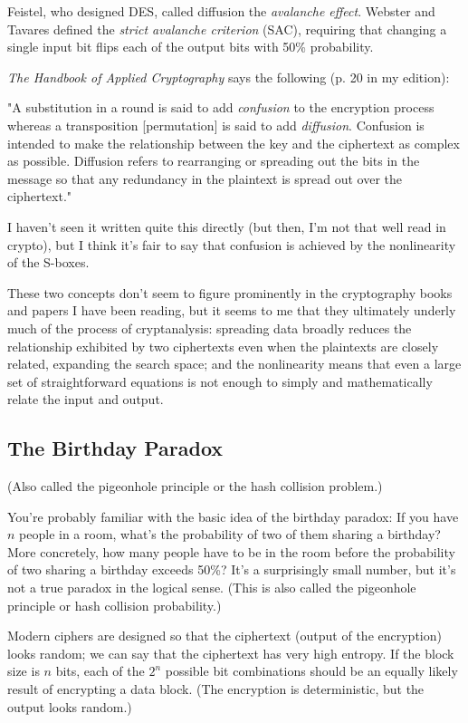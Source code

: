 \documentclass[%
 aip,
 jmp,%
 amsmath,amssymb,
 reprint,%
]{revtex4-1}
\begin{document}
Feistel, who designed DES, called diffusion the \emph{avalanche effect}.
Webster and Tavares defined the \emph{strict avalanche criterion} (SAC),
requiring that changing a single input bit flips each of the output
bits with 50\% probability.

\emph{The Handbook of Applied Cryptography} says the following (p. 20 in my
edition):

"A substitution in a round is said to add \emph{confusion} to the
encryption process whereas a transposition [permutation] is said to
add \emph{diffusion}. Confusion is intended to make the relationship
between the key and the ciphertext as complex as possible.  Diffusion
refers to rearranging or spreading out the bits in the message so that
any redundancy in the plaintext is spread out over the ciphertext."

I haven't seen it written quite this directly (but then, I'm not that
well read in crypto), but I think it's fair to say that confusion is
achieved by the nonlinearity of the S-boxes.

These two concepts don't seem to figure prominently in the
cryptography books and papers I have been reading, but it seems to me
that they ultimately underly much of the process of cryptanalysis:
spreading data broadly reduces the relationship exhibited by two
ciphertexts even when the plaintexts are closely related, expanding
the search space; and the nonlinearity means that even a large set of
straightforward equations is not enough to simply and mathematically
relate the input and output.

\subsection{The Birthday Paradox}

(Also called the pigeonhole principle or the hash collision problem.)

You're probably familiar with the basic idea of the birthday paradox:
If you have $n$ people in a room, what's the probability of two of
them sharing a birthday?  More concretely, how many people have to be
in the room before the probability of two sharing a birthday exceeds
50\%?  It's a surprisingly small number, but it's not a true paradox in
the logical sense.  (This is also called the pigeonhole principle or
hash collision probability.)

Modern ciphers are designed so that the ciphertext (output of the
encryption) looks random; we can say that the ciphertext has very high
entropy.  If the block size is $n$ bits, each of the $2^n$ possible
bit combinations should be an equally likely result of encrypting a
data block.  (The encryption is deterministic, but the output looks
random.)
\end{document}
